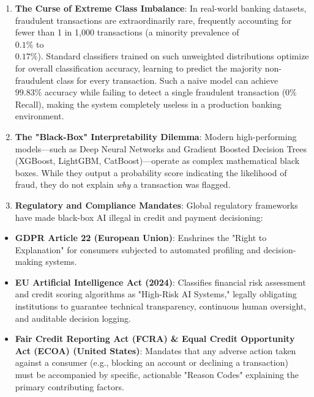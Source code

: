 \documentclass[12pt,a4paper,oneside]{report}
\begin{document}
\begin{enumerate}[leftmargin=0.35in]
\item \textbf{The Curse of Extreme Class Imbalance}: In real-world banking datasets, fraudulent transactions are extraordinarily rare, frequently accounting for fewer than 1 in 1,000 transactions (a minority prevalence of \\$0.1\%$ to \\$0.17\%$). Standard classifiers trained on such unweighted distributions optimize for overall classification accuracy, learning to predict the majority non-fraudulent class for every transaction. Such a naive model can achieve \\$99.83\%$ accuracy while failing to detect a single fraudulent transaction (0\% Recall), making the system completely useless in a production banking environment.
\item \textbf{The "Black-Box" Interpretability Dilemma}: Modern high-performing models---such as Deep Neural Networks and Gradient Boosted Decision Trees (XGBoost, LightGBM, CatBoost)---operate as complex mathematical black boxes. While they output a probability score indicating the likelihood of fraud, they do not explain \textit{why} a transaction was flagged.
\item \textbf{Regulatory and Compliance Mandates}: Global regulatory frameworks have made black-box AI illegal in credit and payment decisioning:
\end{enumerate}
\begin{itemize}[leftmargin=0.35in]
\item \textbf{GDPR Article 22 (European Union)}: Enshrines the "Right to Explanation" for consumers subjected to automated profiling and decision-making systems.
\item \textbf{EU Artificial Intelligence Act (2024)}: Classifies financial risk assessment and credit scoring algorithms as "High-Risk AI Systems," legally obligating institutions to guarantee technical transparency, continuous human oversight, and auditable decision logging.
\item \textbf{Fair Credit Reporting Act (FCRA) \& Equal Credit Opportunity Act (ECOA) (United States)}: Mandates that any adverse action taken against a consumer (e.g., blocking an account or declining a transaction) must be accompanied by specific, actionable "Reason Codes" explaining the primary contributing factors.
\end{itemize}
\end{document}
